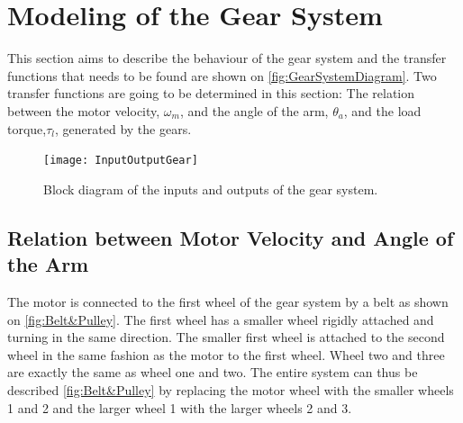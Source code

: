 
\graphicspath{{figures/modeling/gearTrain/}}
\section{Modeling of the Gear System}\label{sec:ModGearSys}
This section aims to describe the behaviour of the gear system and the transfer functions that needs to be found are shown on 
\autoref{fig:GearSystemDiagram}.
Two transfer functions are going to be determined in this section: The relation between the motor velocity, $\omega_m$, and the angle of the arm, $\theta_a$, and the load torque,$\tau_l$, generated by the gears.
\begin{figure}[htbp]
	\centering
	\texttt{[image: InputOutputGear]}
	\caption{Block diagram of the inputs and outputs of the gear system.}
	\label{fig:GearSystemDiagram}
\end{figure}

\startexplain
{}
\stopexplain


\subsection{Relation between Motor Velocity and Angle of the Arm}
The motor is connected to the first wheel of the gear system by a belt as shown on \autoref{fig:Belt&Pulley}. The first wheel has a smaller wheel rigidly attached and turning in the same direction. The smaller first wheel is attached to the second wheel in the same fashion as the motor to the first wheel. Wheel two and three are exactly the same as wheel one and two. The entire system can thus be described \autoref{fig:Belt&Pulley} by replacing the motor wheel with the smaller wheels 1 and 2 and the larger wheel 1 with the larger wheels 2 and 3.

